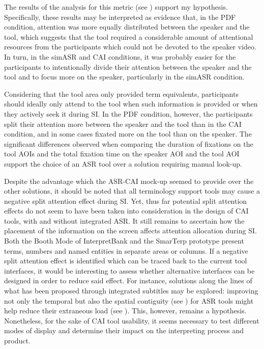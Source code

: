 The results of the analysis for this metric (see ) support my hypothesis. Specifically, these results may be interpreted as evidence that, in the PDF condition, attention was more equally distributed between the speaker and the tool, which suggests that the tool required a considerable amount of attentional resources from the participants which could not be devoted to the speaker video. In turn, in the simASR and CAI conditions, it was probably easier for the participants to intentionally divide their attention between the speaker and the tool and to focus more on the speaker, particularly in the simASR condition.

Considering that the tool area only provided term equivalents, participants should ideally only attend to the tool when such information is provided or when they actively seek it during SI. In the PDF condition, however, the participants split their attention more between the speaker and the tool than in the CAI condition, and in some cases fixated more on the tool than on the speaker. The significant differences observed when comparing the duration of fixations on the tool AOIs and the total fixation time on the speaker AOI and the tool AOI support the choice of an ASR tool over a solution requiring manual look-up.

Despite the advantage which the ASR-CAI mock-up seemed to provide over the other solutions, it should be noted that all terminology support tools may cause a negative split attention effect during SI. Yet, thus far potential split attention effects do not seem to have been taken into consideration in the design of CAI tools, with and without integrated ASR. It still remains to ascertain how the placement of the information on the screen affects attention allocation during SI. Both the Booth Mode of InterpretBank \citep{defrancq_automatic_2020} and the SmarTerp prototype \citep{frittella_cai-supported_2021} present terms, numbers and named entities in separate areas or columns. If a negative split attention effect is identified which can be traced back to the current tool interfaces, it would be interesting to assess whether alternative interfaces can be designed in order to reduce said effect. For instance, solutions along the lines of what has been proposed through integrated subtitles \citep{fox_can_2018} may be explored: improving not only the temporal but also the spatial contiguity (see ) for ASR tools might help reduce their extraneous load (see ). This, however, remains a hypothesis. Nonetheless, for the sake of CAI tool usability, it seems necessary to test different modes of display and determine their impact on the interpreting process and product.

